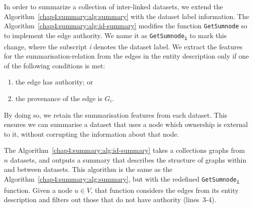 
In order to summarize a collection of inter-linked datasets, we extend the Algorithm~\ref{chap4:summary:alg:summary} with the dataset label information.
The Algorithm~\ref{chap4:summary:alg:id-summary} modifies the function \texttt{GetSumnode} so to implement the edge authority.
We name it as \texttt{GetSumnode\textsubscript{i}} to mark this change, where the subscript \emph{i} denotes the dataset label.
We extract the features for the \gls{summarisation-relation} from the edges in the entity description  only if one of the following conditions is met:
\begin{enumerate}
\item the edge has authority; or
\item the provenance of the edge is $G_i$.
\end{enumerate}
By doing so, we retain the summarisation features from each dataset. This ensures we can summarise a dataset that uses a node which ownership is external to it, without corrupting the information about that node.%

The Algorithm~\ref{chap4:summary:alg:id-summary} takes a collections graphs from $n$ datasets, and outputs a summary that describes the structure of graphs within and between datasets. This algorithm is the same as the Algorithm~\ref{chap4:summary:alg:summary}, but with the redefined \texttt{GetSumnode\textsubscript{i}} function. Given a node $u \in V$, that function considers the edges from its entity description and filters out those that do not have authority (lines~3-4).

